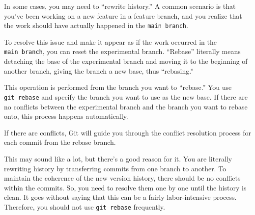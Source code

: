 \documentclass[
  letterpaper,
  DIV=11,
  numbers=noendperiod]{scrreprt}
\begin{document}
In some cases, you may need to ``rewrite history.'' A common scenario is
that you've been working on a new feature in a feature branch, and you
realize that the work should have actually happened in the
\texttt{main\ branch}.

To resolve this issue and make it appear as if the work occurred in the
\texttt{main\ branch}, you can reset the experimental branch. ``Rebase''
literally means detaching the base of the experimental branch and moving
it to the beginning of another branch, giving the branch a new base,
thus ``rebasing.''

This operation is performed from the branch you want to ``rebase.'' You
use \texttt{git\ rebase} and specify the branch you want to use as the
new base. If there are no conflicts between the experimental branch and
the branch you want to rebase onto, this process happens automatically.

If there are conflicts, Git will guide you through the conflict
resolution process for each commit from the rebase branch.

This may sound like a lot, but there's a good reason for it. You are
literally rewriting history by transferring commits from one branch to
another. To maintain the coherence of the new version history, there
should be no conflicts within the commits. So, you need to resolve them
one by one until the history is clean. It goes without saying that this
can be a fairly labor-intensive process. Therefore, you should not use
\texttt{git\ rebase} frequently.
\end{document}
